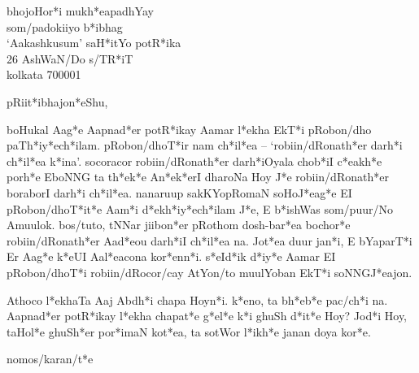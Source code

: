 \documentclass[12pt]{bletter}
\date{\today}
\begin{document}
\bng
\begin{letter}{bhojoHo\*r*i mu\*kh*eapadhYay\\
som/padokiiyo \*b*ibhag\\ `Aakashkusum' sa\*H*itYo po\*tR*ika \\ 26 
AshWaN/Do \*s/TR*iT\\ kolkata 700001}
\address{72 bonomalii nos/kor \*l*en\\ kolkata 700999 \\[7pt]
\*ph*ean~: 123-4567}
\signature{narayoN laHa (nala)}


\opening{pRii\*t*ibhajo\*n*eShu,} 

boHukal Aa\*g*e Aapna\*d*er
po\*tR*ikay Aamar \*l*ekha Ek\*T*i pRobon/dho
pa\*Th*i\*y*e\*ch*ilam. pRobon/dho\*T*ir nam \*ch*i\*l*ea --
`robiin/dRona\*th*er da\*rh*i \*ch*i\*l*ea \*k*ina'. socoracor
robiin/dRona\*th*er da\*rh*iOyala cho\*b*iI \*c*ea\*kh*e po\*rh*e
EboNNG ta \*th*e\*k*e A\*n*e\*k*erI dharoNa Hoy \*J*e
robiin/dRona\*th*er boraborI da\*rh*i \*ch*i\*l*ea. nanaruup
sakKYopRomaN soHo\*J*ea\*g*e EI pRobon/dho\*T*i\*t*e Aa\*m*i
\*d*e\*kh*i\*y*e\*ch*ilam \*J*e, E \*b*ishWas som/puur/No
Amuulok. bos/tuto, tNNar jiibo\*n*er pRothom dosh-ba\*r*ea bocho\*r*e
robiin/dRona\*th*er Aa\*d*eou da\*rh*iI \*ch*i\*l*ea na. Jo\*t*ea duur
ja\*n*i, E bYapar\*T*i Er Aa\*g*e \*k*eUI Aa\*l*eacona
ko\*r*en\*n*i. \*s*eI\*d*ik \*d*i\*y*e Aamar EI pRobon/dho\*T*i
robiin/dRocor/cay AtYon/to muulYoban Ek\*T*i soNNG\*J*eajon.

Athoco \*l*ekhaTa Aaj Ab\*dh*i chapa Hoy\*n*i. \*k*eno, ta \*bh*e\*b*e
pa\*c/ch*i na. Aapna\*d*er po\*tR*ikay \*l*ekha chapa\*t*e \*g*e\*l*e
\*k*i ghuSh \*d*i\*t*e Hoy? Jo\*d*i Hoy, taHo\*l*e ghu\*Sh*er
po\*r*imaN ko\*t*ea, ta sotWor \*l*i\*kh*e janan doya ko\*r*e.

\closing{nomos/kara\*n/t*e}

\end{letter}
\end{document}
